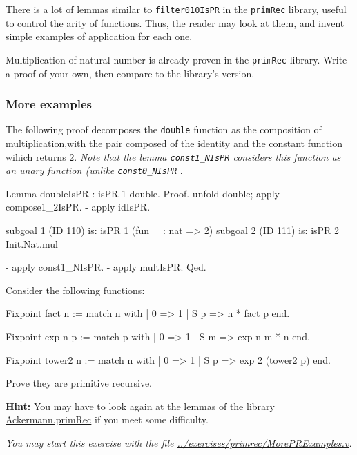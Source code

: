 \begin{exercise}
There is a lot of lemmas similar to \texttt{filter010IsPR} in the \texttt{primRec} library, useful to control the arity of functions.
Thus, the reader may look at them, and invent simple examples of application for each one.
\end{exercise}

\begin{exercise}
Multiplication of natural number is already proven in the \texttt{primRec} library. Write a proof of your own, then compare to the library's version.
\end{exercise}

\subsubsection{More examples}

The following proof decomposes the \texttt{double} function as the composition of 
multiplication,with the pair composed of the identity and the constant function wihich returns $2$.
\emph{Note that the lemma \texttt{const1\_NIsPR} considers this function as an unary function (unlike \texttt{const0\_NIsPR} }. 

\begin{Coqsrc}
Lemma doubleIsPR : isPR 1 double.
Proof.
  unfold double; apply compose1_2IsPR.
  - apply idIsPR.
\end{Coqsrc}

\begin{Coqanswer}
subgoal 1 (ID 110) is:
 isPR 1 (fun _ : nat => 2)
subgoal 2 (ID 111) is:
 isPR 2 Init.Nat.mul
\end{Coqanswer}

 \begin{Coqsrc}
  - apply const1_NIsPR.
  - apply multIsPR.
Qed.
\end{Coqsrc}

\begin{exercise}
Consider the following functions:

\begin{Coqsrc}
Fixpoint fact n :=
  match n with 
          | 0 => 1
          | S p  => n * fact p
  end.

Fixpoint exp n p :=
  match p with
  | 0 => 1
  | S m =>  exp n m * n
  end.

Fixpoint tower2 n :=
  match n with
  | 0 => 1
  | S p => exp 2 (tower2 p)
  end.
\end{Coqsrc}

Prove they are primitive recursive.

\textbf{Hint:} You may have to look again at the lemmas of the library
\href{../theories/html/hydras.Ackermann.primRec.html}{Ackermann.primRec} if you meet some difficulty.

\emph{You may start this exercise with the file
\url{../exercises/primrec/MorePRExamples.v}.}
\end{exercise}



